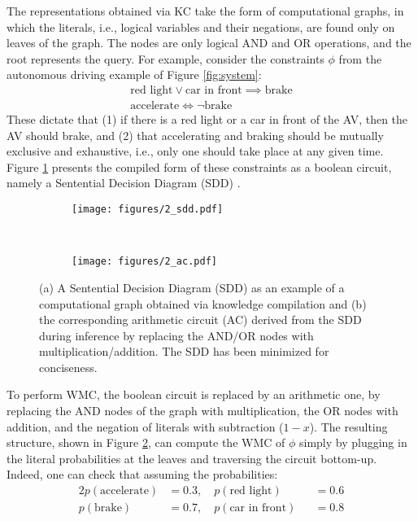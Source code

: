 The representations obtained via KC take the form of computational graphs, in which the literals, i.e., logical variables and their negations, are found only on leaves of the graph. The nodes are only logical $\mathrm{AND}$ and $\mathrm{OR}$ operations, and the root represents the query. For example, consider the constraints $\phi$ from the autonomous driving example of Figure \ref{fig:system}:
\begin{equation*}
\begin{gathered}
\text{red light} \lor \text{car in front} \implies \text{brake} \\
\text{accelerate} \iff \neg \text{brake}
\end{gathered}
\end{equation*}
\noindent These dictate that (1) if there is a red light or a car in front of the AV, then the AV should brake, and (2) that accelerating and braking should be mutually exclusive and exhaustive, i.e., only one should take place at any given time. Figure \ref{fig:sdd} presents the compiled form of these constraints as a boolean circuit, namely a Sentential Decision Diagram (SDD) \cite{darwiche2011sdd}.
\begin{figure}[!h]
    \centering
    \begin{subfigure}[t]{0.5\linewidth}
        \centering
        \texttt{[image: figures/2\_sdd.pdf]}
        \caption{}
        \label{fig:sdd}
    \end{subfigure}%
    ~ 
    \begin{subfigure}[t]{0.5\linewidth}
        \centering
        \texttt{[image: figures/2\_ac.pdf]}
        \caption{}
        \label{fig:ac}
    \end{subfigure}
    \caption{(a) A Sentential Decision Diagram (SDD) as an example of a computational graph obtained via knowledge compilation and (b) the corresponding arithmetic circuit (AC) derived from the SDD during inference by replacing the AND/OR nodes with multiplication/addition. The SDD has been minimized for conciseness.}
    \label{fig:circuit}
\end{figure}
To perform WMC, the boolean circuit is replaced by an arithmetic one, by replacing the $\mathrm{AND}$ nodes of the graph with multiplication, the $\mathrm{OR}$ nodes with addition, and the negation of literals with subtraction ($1-x$). The resulting structure, shown in Figure \ref{fig:ac}, can compute the WMC of $\phi$ simply by plugging in the literal probabilities at the leaves and traversing the circuit bottom-up. Indeed, one can check that assuming the probabilities:
\begin{alignat*}{2}
p(\text{accelerate}) &= 0.3, \quad p(\text{red light}) &&= 0.6 \\ 
p(\text{brake}) &= 0.7, \quad p(\text{car in front}) &&= 0.8
\end{alignat*}

